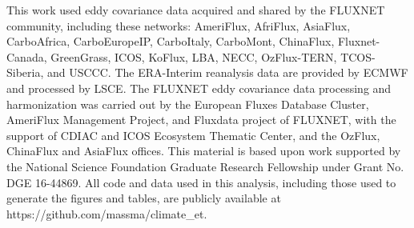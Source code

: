 \documentclass[draft,linenumbers]{afmjournal}
\begin{document}
\acknowledgments This work used eddy covariance data acquired and
shared by the FLUXNET community, including these networks: AmeriFlux,
AfriFlux, AsiaFlux, CarboAfrica, CarboEuropeIP, CarboItaly, CarboMont,
ChinaFlux, Fluxnet-Canada, GreenGrass, ICOS, KoFlux, LBA, NECC,
OzFlux-TERN, TCOS-Siberia, and USCCC. The ERA-Interim reanalysis data
are provided by ECMWF and processed by LSCE. The FLUXNET eddy
covariance data processing and harmonization was carried out by the
European Fluxes Database Cluster, AmeriFlux Management Project, and
Fluxdata project of FLUXNET, with the support of CDIAC and ICOS
Ecosystem Thematic Center, and the OzFlux, ChinaFlux and AsiaFlux
offices. This material is based upon work supported by the National
Science Foundation Graduate Research Fellowship under Grant No. DGE
16-44869. All code and data used in this analysis, including those
used to generate the figures and tables, are publicly available at
https://github.com/massma/climate\_et.



\end{document}
